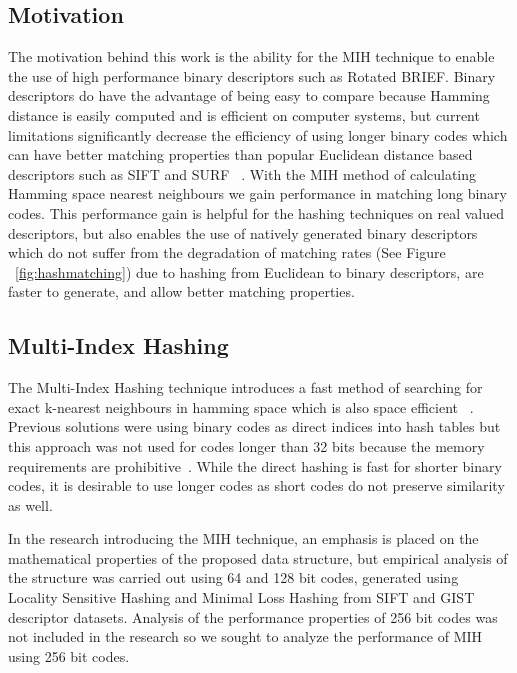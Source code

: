 \subsection{Motivation}
The motivation behind this work is the ability for the MIH technique to enable the use of high performance binary descriptors such as Rotated BRIEF. Binary descriptors do have the advantage of being easy to compare because Hamming distance is easily computed and is efficient on computer systems, but current limitations significantly decrease the efficiency of using longer binary codes which can have better matching properties than popular Euclidean distance based descriptors such as SIFT and SURF ~\cite{rublee2011orb}. With the MIH method of calculating Hamming space nearest neighbours we gain performance in matching long binary codes. This performance gain is helpful for the hashing techniques on real valued descriptors, but also enables the use of natively generated binary descriptors which do not suffer from the degradation of matching rates (See Figure ~\ref{fig:hashmatching}) due to hashing from Euclidean to binary descriptors, are faster to generate, and allow better matching properties.

\subsection{Multi-Index Hashing}
The Multi-Index Hashing technique introduces a fast method of searching for exact k-nearest neighbours in hamming space which is also space efficient~\cite{norouzi2012fast} . Previous solutions were using binary codes as direct indices into hash tables but this approach was not used for codes longer than 32 bits because the memory requirements are prohibitive~\cite{torralba2008small}. While the direct hashing is fast for shorter binary codes, it is desirable to use longer codes as short codes do not preserve similarity as well.

In the research introducing the MIH technique, an emphasis is placed on the mathematical properties of the proposed data structure, but empirical analysis of the structure was carried out using 64 and 128 bit codes, generated using Locality Sensitive Hashing and Minimal Loss Hashing from SIFT and GIST descriptor datasets. Analysis of the performance properties of 256 bit codes was not included in the research so we sought to analyze the performance of MIH using 256 bit codes.